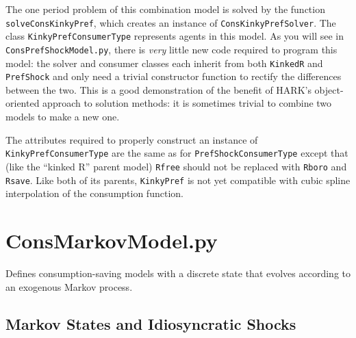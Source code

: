 \documentclass[12pt,titlepage,letterpaper]{econtex}
\begin{document}
The one period problem of this combination model is solved by the function \texttt{solveConsKinkyPref}, which creates an instance of \texttt{ConsKinkyPrefSolver}.  The class \texttt{KinkyPrefConsumerType} represents agents in this model.  As you will see in \texttt{ConsPrefShockModel.py}, there is \textit{very} little new code required to program this model: the solver and consumer classes each inherit from both \texttt{KinkedR} and \texttt{PrefShock} and only need a trivial constructor function to rectify the differences between the two.  This is a good demonstration of the benefit of HARK's object-oriented approach to solution methods: it is sometimes trivial to combine two models to make a new one.

The attributes required to properly construct an instance of \texttt{KinkyPrefConsumerType} are the same as for \texttt{PrefShockConsumerType} except that (like the ``kinked R'' parent model) \texttt{Rfree} should not be replaced with \texttt{Rboro} and \texttt{Rsave}.  Like both of its parents, \texttt{KinkyPref} is not yet compatible with cubic spline interpolation of the consumption function.

\newpage

\section{ConsMarkovModel.py}

Defines consumption-saving models with a discrete state that evolves according to an exogenous Markov process.

\subsection{Markov States and Idiosyncratic Shocks}
\end{document}
